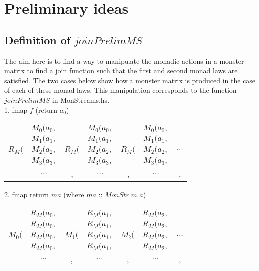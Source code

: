 \documentclass{article}
\begin{document}
	
\section{Preliminary ideas}
	
\subsection{Definition of $ joinPrelimMS $}
	
The aim here is to find a way to manipulate the monadic actions in a monster matrix to find a join function such that the first and second monad laws are satisfied. The two cases below show how a monster matrix is produced in the case of each of these monad laws. This manipulation corresponds to the function $joinPrelimMS$ in MonStreams.hs.\\
\vspace{1cm}
1. fmap $f$ (return $a_0$)
\begin{center}
\begin{tabular}{c c c c c c c}
	     & $M_0 (a_0,$  &       &$M_0 (a_0,$  &       &$M_0 (a_0,$\\
	     & $M_1 (a_1,$  &       &$M_1 (a_1,$  &       &$M_1 (a_1,$\\
  $R_M ($& $M_2 (a_2,$  &$R_M ($&$M_2 (a_2,$  &$R_M ($&$M_2 (a_2,$ & $...$\\
		 & $M_3 (a_3,$  &       &$M_3 (a_3,$  &       &$M_3 (a_3,$\\
		 & $...$  &,       &$...$  &,       &$...$ &, \\
\end{tabular}
\end{center}
\vspace{1cm}
2. fmap return $ma$ (where $ma$ :: $MonStr$ $m$ $a$)
\begin{center}
\begin{tabular}{c c c c c c c}
	     & $R_M (a_0,$  &       &$R_M (a_1,$  &       &$R_M (a_2,$\\
	     & $R_M (a_0,$  &       &$R_M (a_1,$  &       &$R_M (a_2,$\\
  $M_0 ($& $R_M (a_0,$  &$M_1 ($&$R_M (a_1,$  &$M_2 ($&$R_M (a_2,$ & $...$\\
		 & $R_M (a_0,$  &       &$R_M (a_1,$  &       &$R_M (a_2,$\\
		 & $...$  &,       &$...$  &,       &$...$ &, \\
\end{tabular}
\end{center}
\end{document}

